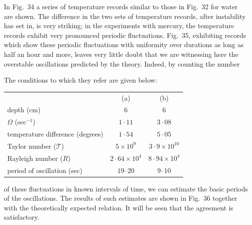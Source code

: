 In Fig.~34 a series of temperature records similar to those in Fig.~32
for water are shown.  The difference in the two sets of temperature
records, after instability has set in, is very striking; in the experiments
with mercury, the temperature records exhibit very pronounced periodic
fluctuations.  Fig.~35, exhibiting records which show these periodic
fluctuations with uniformity over durations as long as half an hour and
more, leaves very little doubt that we are witnessing here the overstable
oscillations predicted by the theory.  Indeed, by counting the number


\noindent The conditions to which they refer are given below:
\begin{center}
\begin{tabular}{lcc}
  & (a) & (b) \\
depth (cm) & 6 & 6 \\
$\Omega$ (sec$^{-1}$) & $1{\cdot}11$ & $3{\cdot}08$ \\
temperature difference (degrees) & $1{\cdot}54$ & $5{\cdot}05$ \\
Taylor number ($\mathscr{T}$) & $5 \times 10^9$ & $3{\cdot}9 \times 10^{10}$ \\
Rayleigh number ($R$) & $2{\cdot}64 \times 10^4$ & $8{\cdot}94 \times 10^4$ \\
period of oscillation (sec) & $19$--$20$ & $9$--$10$
\end{tabular}
\end{center}

\noindent of these fluctuations in known intervals of time, we can estimate the
basic periods of the oscillations.  The results of such estimates are shown
in Fig.~36 together with the theoretically expected relation.  It will be
seen that the agreement is satisfactory.



